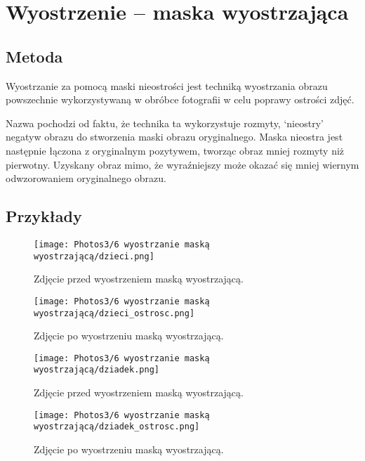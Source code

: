 \documentclass[]{mwart}
\begin{document}
\newpage
\section{Wyostrzenie -- maska wyostrzająca      }

\subsection{Metoda}
Wyostrzanie za pomocą maski nieostrości jest techniką wyostrzania obrazu
powszechnie wykorzystywaną w obróbce fotografii w celu poprawy ostrości zdjęć.

Nazwa pochodzi od faktu, że technika ta wykorzystuje rozmyty,
`nieostry' negatyw obrazu do stworzenia maski obrazu oryginalnego.
Maska nieostra jest następnie łączona z oryginalnym pozytywem,
tworząc obraz mniej rozmyty niż pierwotny. Uzyskany obraz mimo, że wyraźniejszy
może okazać się mniej wiernym odwzorowaniem oryginalnego obrazu.

\subsection{Przykłady}
\begin{figure}[H]
    \centering
    \texttt{[image: Photos3/6 wyostrzanie maską wyostrzającą/dzieci.png]}
    \caption{Zdjęcie przed wyostrzeniem maską wyostrzającą.}
\end{figure}
\begin{figure}[H]
    \centering
    \texttt{[image: Photos3/6 wyostrzanie maską wyostrzającą/dzieci\_ostrosc.png]}
    \caption{Zdjęcie po wyostrzeniu maską wyostrzającą.}
\end{figure}

\begin{figure}[H]
    \centering
    \texttt{[image: Photos3/6 wyostrzanie maską wyostrzającą/dziadek.png]}
    \caption{Zdjęcie przed wyostrzeniem maską wyostrzającą.}
\end{figure}
\begin{figure}[H]
    \centering
    \texttt{[image: Photos3/6 wyostrzanie maską wyostrzającą/dziadek\_ostrosc.png]}
    \caption{Zdjęcie po wyostrzeniu maską wyostrzającą.}
\end{figure}
\end{document}
